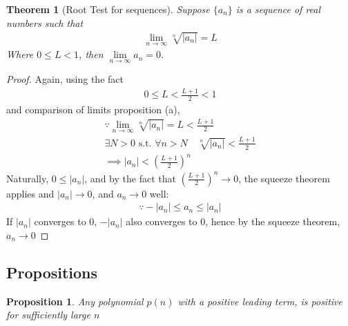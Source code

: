 \documentclass[12pt]{book}
\newtheorem{prop}{Proposition}
\newtheorem{theorem}{Theorem}
\theoremstyle{definition}
\begin{document}
\begin{theorem}[Root Test for sequences]
\label{seq_root_test_thm}
Suppose $\{a_n\}$ is a sequence of real numbers such that
\begin{align*}
\lim_{n \to \infty} \sqrt[n]{|a_n|} = L	
\end{align*}
Where $0\leq L < 1$, then $\lim\limits_{n \to \infty}a_n =0$.
\end{theorem}
\begin{proof}
Again, using the fact
\begin{align*}
0\leq L < \frac{L+1}{2} < 1	
\end{align*}
and comparison of limits proposition (a),
\begin{align*}
\because \lim_{n \to \infty} \sqrt[n]{|a_n|} = L	 < 	\frac{L+1}{2}\\
\exists N>0 \text{ s.t. } \forall n >N \quad \sqrt[n]{|a_n|} < \frac{L+1}{2} \\
\implies |a_n| < \left( \frac{L+1}{2}\right)^n
\end{align*}
Naturally, $0 \leq |a_n|$, and by the fact that $\left( \frac{L+1}{2}\right)^n \to 0$, the squeeze theorem applies and $|a_n| \to 0$, and $a_n \to 0$ well:
\begin{align*}
\because -|a_n| \leq a_n \leq |a_n|	
\end{align*}
If $|a_n|$ converges to 0, $-|a_n|$ also converges to 0, hence by the squeeze theorem, $a_n \to 0$
	
\end{proof}




\subsection{Propositions}

\begin{prop}
Any polynomial $p(n)$ with a positive leading term, is positive for sufficiently large $n$     	
\end{prop}
\end{document}
